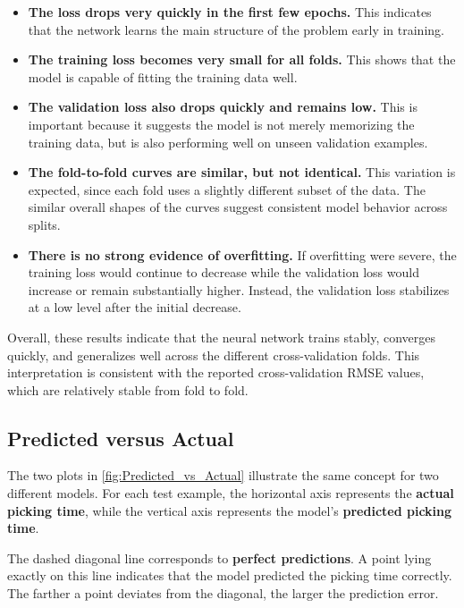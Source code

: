 \documentclass[10pt,twocolumn]{article}
\begin{document}
\begin{itemize}
  \item \textbf{The loss drops very quickly in the first few epochs.}  
  This indicates that the network learns the main structure of the problem early in training.

  \item \textbf{The training loss becomes very small for all folds.}  
  This shows that the model is capable of fitting the training data well.

  \item \textbf{The validation loss also drops quickly and remains low.}  
  This is important because it suggests the model is not merely memorizing the training data, but is also performing well on unseen validation examples.

  \item \textbf{The fold-to-fold curves are similar, but not identical.}  
  This variation is expected, since each fold uses a slightly different subset of the data. The similar overall shapes of the curves suggest consistent model behavior across splits.

  \item \textbf{There is no strong evidence of overfitting.}  
  If overfitting were severe, the training loss would continue to decrease while the validation loss would increase or remain substantially higher. Instead, the validation loss stabilizes at a low level after the initial decrease.
\end{itemize}

Overall, these results indicate that the neural network trains stably, converges quickly, and generalizes well across the different cross-validation folds. This interpretation is consistent with the reported cross-validation RMSE values, which are relatively stable from fold to fold.

\subsection{Predicted versus Actual}

The two plots in \autoref{fig:Predicted_vs_Actual} illustrate the same concept for two different models. For each test example, the horizontal axis represents the \textbf{actual picking time}, while the vertical axis represents the model’s \textbf{predicted picking time}.

The dashed diagonal line corresponds to \textbf{perfect predictions}. A point lying exactly on this line indicates that the model predicted the picking time correctly. The farther a point deviates from the diagonal, the larger the prediction error.
\end{document}
